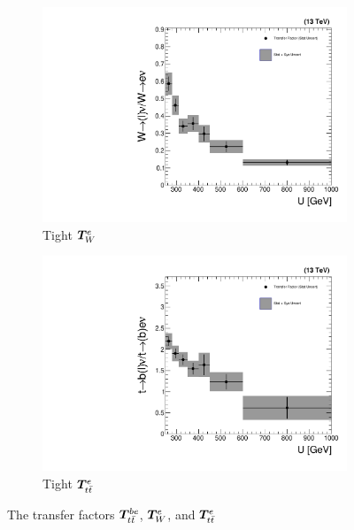 \begin{figure}[]
\begin{center}
\begin{subfigure}[t]{0.32\textwidth}
            \includegraphics[width=\textwidth]{figures/monotop/xfer/rfactor_singleelectronw.pdf}
            \caption{Tight $\bm{T}^{e}_{W}$}
        \end{subfigure}
        \begin{subfigure}[t]{0.32\textwidth}
            \includegraphics[width=\textwidth]{figures/monotop/xfer/rfactor_singleelectronwtop.pdf}
            \caption{Tight $\bm{T}^{e}_{t\bar{t}}$}
        \end{subfigure}
        \caption{The transfer factors $\bm{T}^{be}_{t\bar{t}}$, $\bm{T}^{e}_{W}$, and $\bm{T}^{e}_{t\bar{t}}$}
        \label{fig:mt:en_xfer}
    \end{center}
\end{figure}

